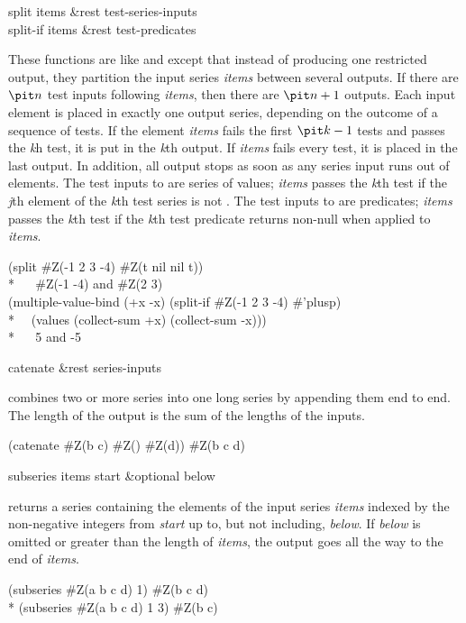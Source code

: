\begin{defun}[Function]
split items &rest test-series-inputs \\
split-if items &rest test-predicates

These functions are like  and  except that
instead of producing one restricted output, they partition the input series
{\it items} between several outputs.  If there are ${\it n}$ test inputs
following {\it items}, then there are ${\it n}+1$ outputs.  Each input element is
placed in exactly one output series, depending on the outcome of a sequence
of tests.  If the element {\it items} fails the first ${\it k}-1$ tests and
passes the {\it k\/}h test, it is put in the {\it k\/}th output.
If {\it items}
fails every test, it is placed in the last output.  In addition, all output
stops as soon as any series input runs out of elements.  The test inputs to
 are series of values; {\it items} passes the {\it k\/}th test
if the {\it j\/}th element of the {\it k\/}th test series is not .  The test
inputs to  are predicates; {\it items} passes the {\it k\/}th
test if the {\it k\/}th test predicate returns non-null when applied to {\it
items}.
\begin{lisp}
(split \#Z(-1 2 3 -4) \#Z(t nil nil t)) \\*
~~{\EV} \#Z(-1 -4) {\rm and} \#Z(2 3) \\
(multiple-value-bind (+x -x) (split-if  \#Z(-1 2 3 -4) \#'plusp) \\*
~~(values (collect-sum +x) (collect-sum -x))) \\*
~~{\EV} 5 {\rm and} -5
\end{lisp}
\end{defun}

\begin{defun}[Function]
catenate &rest series-inputs

 combines two or more series into one long series by appending
them end to end.  The length of the output is the sum of the lengths of the
inputs.
\begin{lisp}
(catenate \#Z(b c) \#Z() \#Z(d)) {\EV} \#Z(b c d)
\end{lisp}
\end{defun}

\begin{defun}[Function]
subseries items start &optional below

 returns a series containing the elements of the input
series {\it items} indexed by the non-negative integers from {\it start} up
to, but not including, {\it below}.  If {\it below} is omitted or greater
than the length of {\it items}, the output goes all the way to the end
of {\it items}.
\begin{lisp}
(subseries \#Z(a b c d) 1) {\EV} \#Z(b c d) \\*
(subseries \#Z(a b c d) 1 3) {\EV} \#Z(b c)
\end{lisp}
\end{defun}

